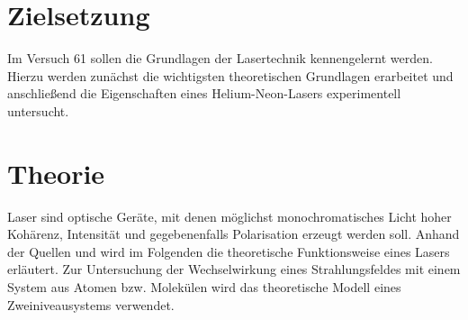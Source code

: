\setcounter{page}{1}
\section*{Zielsetzung}
Im Versuch 61 sollen die Grundlagen der Lasertechnik kennengelernt werden. Hierzu werden zunächst die
wichtigsten theoretischen Grundlagen erarbeitet und anschließend die Eigenschaften eines Helium-Neon-Lasers
experimentell untersucht.
\section{Theorie}
Laser sind optische Geräte, mit denen möglichst monochromatisches Licht hoher Kohärenz, Intensität und gegebenenfalls
Polarisation erzeugt werden soll.
Anhand der Quellen \cite{anleitung61} und \cite{dem} wird im Folgenden die theoretische Funktionsweise eines Lasers
erläutert. Zur Untersuchung der Wechselwirkung eines Strahlungsfeldes mit einem System aus Atomen bzw. Molekülen
wird das theoretische Modell eines Zweiniveausystems verwendet.
